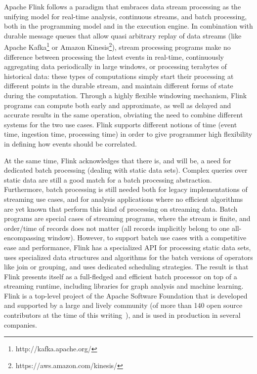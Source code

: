 Apache Flink follows a paradigm that embraces data stream processing as the unifying model for real-time analysis, continuous streams, and batch processing, both in the programming model and in the execution engine. In combination with durable message queues that allow quasi arbitrary replay of data streams (like Apache Kafka\footnote{http://kafka.apache.org/} or Amazon Kinesis\footnote{https://aws.amazon.com/kinesis/}), stream processing programs make no difference between processing the latest events in real-time, continuously aggregating data periodically in large windows, or processing terabytes of historical data: these types of computations simply start their processing at different points in the durable stream, and maintain different forms of state during the computation. Through a highly flexible windowing mechanism, Flink programs can compute both early and approximate, as well as delayed and accurate results in the same operation, obviating the need to combine different systems for the two use cases. Flink supports different notions of time (event time, ingestion time, processing time) in order to give programmer high flexibility in defining how events should be correlated.
 
At the same time, Flink acknowledges that there is, and will be, a need for dedicated batch processing (dealing with static data sets). Complex queries over static data are still a good match for a batch processing abstraction. Furthermore, batch processing is still needed both for legacy implementations of streaming use cases, and for analysis applications where no efficient algorithms are yet known that perform this kind of processing on streaming data. Batch programs are special cases of streaming programs, where the stream is finite, and order/time of records does not matter (all records implicitly belong to one all-encompassing window). However, to support batch use cases with a competitive ease and performance, Flink has a specialized API for processing static data sets, uses specialized data structures and algorithms for the batch versions of operators like join or grouping, and uses dedicated scheduling strategies. The result is that Flink presents itself as a full-fledged and efficient batch processor on top of a streaming runtime, including libraries for graph analysis and machine learning. 
Flink is a top-level project of the Apache Software Foundation that is developed and supported by a large and lively community (of more than 140 open source contributors at the time of this writing~\cite{CUSTOM:web/FlinkContrib}), and is used in production in several companies.


